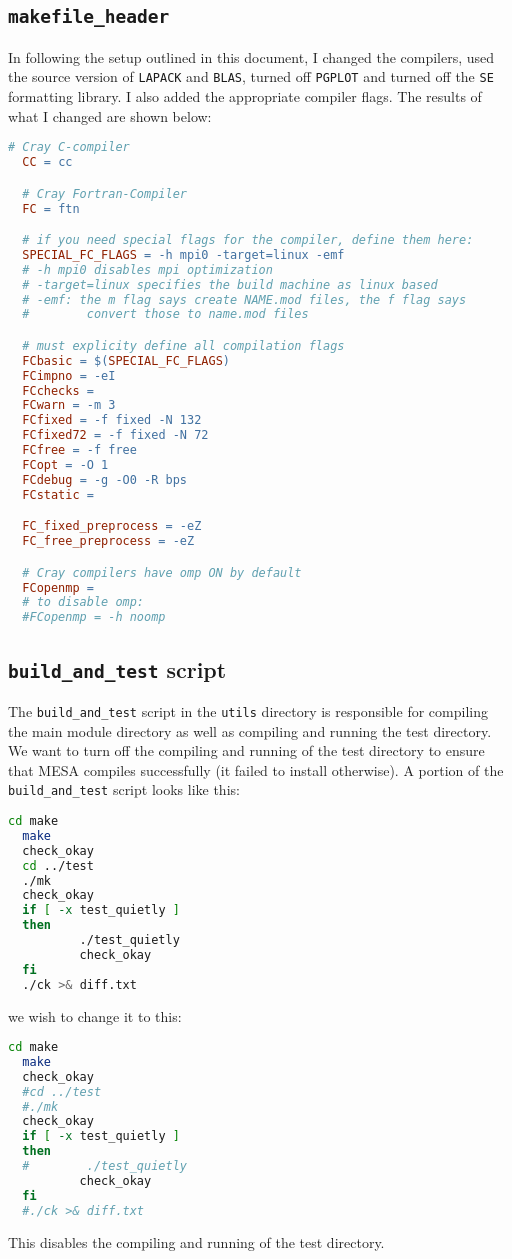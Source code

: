 \subsection{{\tt makefile\_header}}
In following the setup outlined in this document, I changed the compilers, 
used the source version of {\tt LAPACK} and {\tt BLAS}, turned off 
{\tt PGPLOT} and turned off the {\tt SE} formatting library. I also added the 
appropriate compiler flags. The results of what I changed are shown below:
\begin{lstlisting}[language=make,mathescape=false]
  # Cray C-compiler
  CC = cc

  # Cray Fortran-Compiler
  FC = ftn

  # if you need special flags for the compiler, define them here:
  SPECIAL_FC_FLAGS = -h mpi0 -target=linux -emf
  # -h mpi0 disables mpi optimization
  # -target=linux specifies the build machine as linux based
  # -emf: the m flag says create NAME.mod files, the f flag says
  #        convert those to name.mod files

  # must explicity define all compilation flags
  FCbasic = $(SPECIAL_FC_FLAGS)
  FCimpno = -eI
  FCchecks =
  FCwarn = -m 3
  FCfixed = -f fixed -N 132
  FCfixed72 = -f fixed -N 72
  FCfree = -f free
  FCopt = -O 1
  FCdebug = -g -O0 -R bps
  FCstatic =

  FC_fixed_preprocess = -eZ
  FC_free_preprocess = -eZ

  # Cray compilers have omp ON by default
  FCopenmp =
  # to disable omp:
  #FCopenmp = -h noomp 
\end{lstlisting}

\subsection{{\tt build\_and\_test} script}

The {\tt build\_and\_test} script in the {\tt utils} directory is 
responsible for compiling the main module directory as well as compiling 
and running the test directory. We want to turn off the compiling and 
running of the test directory to ensure that {\sf MESA} compiles successfully 
(it failed to install otherwise). A portion of the {\tt build\_and\_test} 
script looks like this:
\begin{lstlisting}[language=bash,mathescape=false]
  cd make
  make
  check_okay
  cd ../test
  ./mk
  check_okay
  if [ -x test_quietly ]
  then
          ./test_quietly
          check_okay
  fi
  ./ck >& diff.txt
\end{lstlisting}
we wish to change it to this:
\begin{lstlisting}[language=bash,mathescape=false]
  cd make
  make
  check_okay
  #cd ../test
  #./mk
  check_okay
  if [ -x test_quietly ]
  then
  #        ./test_quietly
          check_okay
  fi
  #./ck >& diff.txt
\end{lstlisting}
This disables the compiling and running of the test directory.


